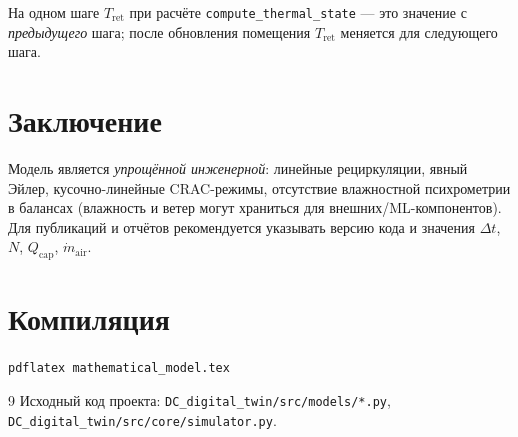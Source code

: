 \documentclass[12pt,a4paper]{article}
\begin{document}
На одном шаге $T_{\mathrm{ret}}$ при расчёте \texttt{compute\_thermal\_state} --- это значение с
\emph{предыдущего} шага; после обновления помещения $T_{\mathrm{ret}}$ меняется для следующего шага.

\section{Заключение}

Модель является \emph{упрощённой инженерной}: линейные рециркуляции, явный Эйлер, кусочно-линейные CRAC-режимы,
отсутствие влажностной психрометрии в балансах (влажность и ветер могут храниться для внешних/ML-компонентов).
Для публикаций и отчётов рекомендуется указывать версию кода и значения $\Delta t$, $N$, $Q_{\mathrm{cap}}$,
$\dot m_{\mathrm{air}}$.

\appendix
\section{Компиляция}
\texttt{pdflatex mathematical\_model.tex}

\begin{thebibliography}{9}
Исходный код проекта: \texttt{DC\_digital\_twin/src/models/*.py}, \texttt{DC\_digital\_twin/src/core/simulator.py}.
\end{thebibliography}
\end{document}
